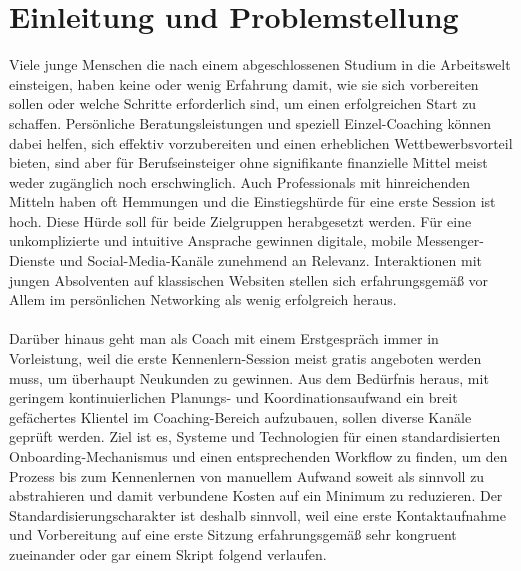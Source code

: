 \chapter{Einleitung und Problemstellung} \label{Einleitung und Problemstellung}
        
    Viele junge Menschen die nach einem abgeschlossenen Studium in die Arbeitswelt einsteigen, haben keine oder wenig Erfahrung damit, wie sie sich vorbereiten sollen oder welche Schritte erforderlich sind, um einen erfolgreichen Start zu schaffen. Persönliche Beratungsleistungen und speziell Einzel-Coaching können dabei helfen, sich effektiv vorzubereiten und einen erheblichen Wettbewerbsvorteil bieten, sind aber für Berufseinsteiger ohne signifikante finanzielle Mittel meist weder zugänglich noch erschwinglich. Auch Professionals mit hinreichenden Mitteln haben oft Hemmungen und die Einstiegshürde für eine erste Session ist hoch. Diese Hürde soll für beide Zielgruppen herabgesetzt werden. Für eine unkomplizierte und intuitive Ansprache gewinnen digitale, mobile Messenger-Dienste und Social-Media-Kanäle zunehmend an Relevanz. Interaktionen mit jungen Absolventen auf klassischen Websiten stellen sich erfahrungsgemäß vor Allem im persönlichen Networking als wenig erfolgreich heraus.\\
    \\
    Darüber hinaus geht man als Coach mit einem Erstgespräch immer in Vorleistung, weil die erste Kennenlern-Session meist gratis angeboten werden muss, um überhaupt Neukunden zu gewinnen. 
    Aus dem Bedürfnis heraus, mit geringem kontinuierlichen Planungs- und Koordinationsaufwand ein breit gefächertes Klientel im Coaching-Bereich aufzubauen, sollen diverse Kanäle geprüft werden. Ziel ist es, Systeme und Technologien für einen standardisierten Onboarding-Mechanismus und einen entsprechenden Workflow zu finden, um den Prozess bis zum Kennenlernen von manuellem Aufwand soweit als sinnvoll zu abstrahieren und damit verbundene Kosten auf ein Minimum zu reduzieren. Der Standardisierungscharakter ist deshalb sinnvoll, weil eine erste Kontaktaufnahme und Vorbereitung auf eine erste Sitzung erfahrungsgemäß sehr kongruent zueinander oder gar einem Skript folgend verlaufen. \\
    \\
